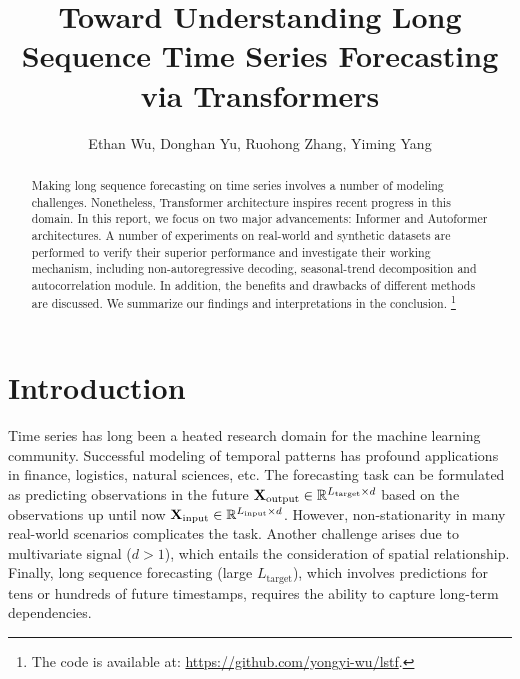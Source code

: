 \documentclass[12pt]{article}
\title{Toward Understanding Long Sequence Time Series Forecasting via Transformers}
\author{Ethan Wu, Donghan Yu, Ruohong Zhang, Yiming Yang}
\date{}
\begin{document}
\maketitle
\begin{abstract}
Making long sequence forecasting on time series involves a number of modeling challenges. 
Nonetheless, Transformer architecture inspires recent progress in this domain. 
In this report, we focus on two major advancements: Informer and Autoformer architectures. 
A number of experiments on real-world and synthetic datasets are performed to verify their superior performance and investigate their working mechanism, including non-autoregressive decoding, seasonal-trend decomposition and autocorrelation module. 
In addition, the benefits and drawbacks of different methods are discussed. 
We summarize our findings and interpretations in the conclusion. \footnote{The code is available at: \href{https://github.com/yongyi-wu/lstf}{https://github.com/yongyi-wu/lstf}.}
\end{abstract}

\section{Introduction}
Time series has long been a heated research domain for the machine learning community. 
Successful modeling of temporal patterns has profound applications in finance, logistics, natural sciences, etc. 
The forecasting task can be formulated as predicting observations in the future $\mathbf{X}_\text{output} \in \mathbb{R}^{L_\text{target} \times d}$ based on the observations up until now $\mathbf{X}_\text{input} \in \mathbb{R}^{L_\text{input} \times d}$. 
However, non-stationarity in many real-world scenarios complicates the task. 
Another challenge arises due to multivariate signal ($d > 1$), which entails the consideration of spatial relationship. 
Finally, long sequence forecasting (large $L_\text{target}$), which involves predictions for tens or hundreds of future timestamps, requires the ability to capture long-term dependencies. 
\end{document}
